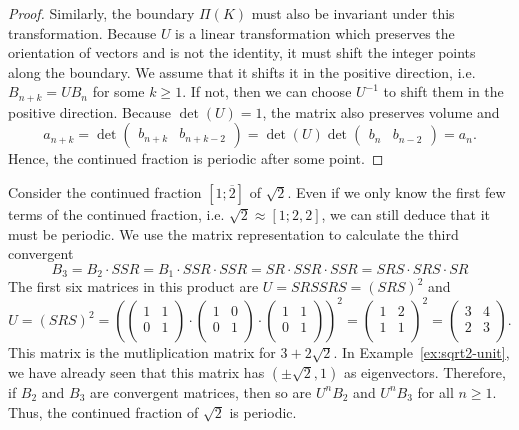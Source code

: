 \begin{proof}
  Similarly, the boundary $Π(K)$ must also be invariant under this transformation.
  Because $U$ is a linear transformation which preserves the orientation of
  vectors and is not the identity, it must shift the integer points along the
  boundary.
  We assume that it shifts it in the positive direction,
  i.e. $B_{n+k} = U B_n$ for some $k ≥ 1$.
  If not, then we can choose $U^{-1}$ to shift them in the positive direction.
  Because $\det(U) = 1$, the matrix also preserves volume and
  \[
    a_{n+k}
    = \det\begin{pmatrix}
      b_{n+k} & b_{n+k-2}
    \end{pmatrix}
    = \det(U) \det\begin{pmatrix}
      b_n & b_{n-2}
    \end{pmatrix}
    = a_n.
  \]
  Hence, the continued fraction is periodic after some point.
\end{proof}

\begin{example}
  Consider the continued fraction $[1; \overline{2}]$ of $\sqrt{2}$.
  Even if we only know the first few terms of the continued fraction, i.e.
  $\sqrt{2} ≈ [1; 2, 2]$, we can still deduce that it must be periodic.
  We use the matrix representation to calculate the third convergent
  \[
    B_3 = B_2 · SSR = B_1 · SSR · SSR = SR · SSR · SSR = SRS · SRS · SR
  \]
  The first six matrices in this product are $U = SRSSRS = (SRS)^2$
  and
  \[
    U = (SRS)^2 =
    \left(
    \begin{pmatrix}
      1 & 1 \\
      0 & 1 \\
    \end{pmatrix}
    ·
    \begin{pmatrix}
      1 & 0 \\
      0 & 1 \\
    \end{pmatrix}
    ·
    \begin{pmatrix}
      1 & 1 \\
      0 & 1 \\
    \end{pmatrix}
    \right)^2
    =
    \begin{pmatrix}
      1 & 2 \\
      1 & 1 \\
    \end{pmatrix}^2
    =
    \begin{pmatrix}
      3 & 4 \\
      2 & 3 \\
    \end{pmatrix}
    .
  \]
  This matrix is the mutliplication matrix for $3 + 2\sqrt{2}$.
  In Example~\vref{ex:sqrt2-unit},
  we have already seen that this matrix has $(±\sqrt{2}, 1)$ as eigenvectors.
  Therefore, if $B_2$ and $B_3$ are convergent matrices,
  then so are $U^n B_2$ and $U^n B_3$ for all $n ≥ 1$.
  Thus, the continued fraction of $\sqrt{2}$ is periodic.
\end{example}
